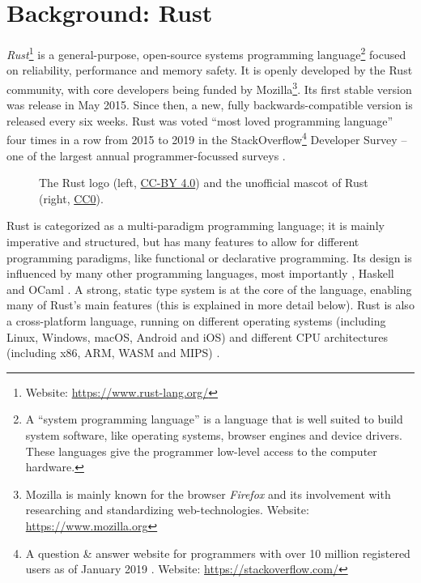 \chapter{Background: Rust}

\emph{Rust}\footnote{Website: \url{https://www.rust-lang.org/}} is a general-purpose, open-source systems programming language\footnote{A \enquote{system programming language} is a language that is well suited to build system software, like operating systems, browser engines and device drivers. These languages give the programmer low-level access to the computer hardware.} focused on reliability, performance and memory safety.
It is openly developed by the Rust community, with core developers being funded by Mozilla\footnote{Mozilla is mainly known for the browser \emph{Firefox} and its involvement with researching and standardizing web-technologies. Website: \url{https://www.mozilla.org}}.
Its first stable version was release in May 2015.
Since then, a new, fully backwards-compatible version is released every six weeks.
Rust was voted \enquote{most loved programming language} four times in a row from 2015 to 2019 in the StackOverflow\footnote{A question \& answer website for programmers with over 10 million registered users as of January 2019 \cite{so-user-count}. Website: \url{https://stackoverflow.com/}} Developer Survey -- one of the largest annual programmer-focussed surveys \cite{so-survey}.

\begin{figure}[h]
  \vspace{5mm}
  \centering
  
  \caption{The Rust logo (left, \protect\hyperlink{cc-by}{CC-BY 4.0}) and the unofficial mascot of Rust (right, \protect\hyperlink{cc0}{CC0}).}
  \vspace{5mm}
\end{figure}

Rust is categorized as a multi-paradigm programming language; it is mainly imperative and structured, but has many features to allow for different programming paradigms, like functional or declarative programming.
Its design is influenced by many other programming languages, most importantly \cpp, Haskell and OCaml \cite{rust-influences}.
A strong, static type system is at the core of the language, enabling many of Rust's main features (this is explained in more detail below).
Rust is also a cross-platform language, running on different operating systems (including Linux, Windows, macOS, Android and iOS) and different CPU architectures (including x86, ARM, WASM and MIPS) \cite{rust-platforms}.

